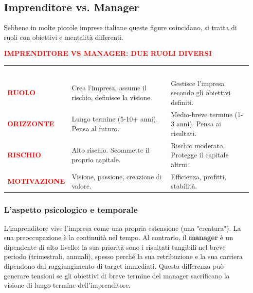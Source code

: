 \documentclass[a4paper,12pt]{article}
\begin{document}
	\subsection{Imprenditore vs. Manager}
	Sebbene in molte piccole imprese italiane queste figure coincidano, si tratta di ruoli con obiettivi e mentalità differenti.
	
	\begin{table}[h!]
		\centering
		\large
		\textbf{\textcolor{red}{IMPRENDITORE VS MANAGER: DUE RUOLI DIVERSI}}\\[0.5cm]
		\renewcommand{\arraystretch}{1.8}
		\begin{tabular}{l p{5.5cm} p{5.5cm}}
			\rowcolor{black}
			& \textbf{\textcolor{white}{IMPRENDITORE}} & \textbf{\textcolor{white}{MANAGER}} \\
			
			\textbf{\textcolor{red}{RUOLO}} & Crea l'impresa, assume il rischio, definisce la visione. & Gestisce l'impresa secondo gli obiettivi definiti. \\ \hline
			
			\textbf{\textcolor{red}{ORIZZONTE}} & Lungo termine (5-10+ anni). Pensa al futuro. & Medio-breve termine (1-3 anni). Pensa ai risultati. \\ \hline
			
			\textbf{\textcolor{red}{RISCHIO}} & Alto rischio. Scommette il proprio capitale. & Rischio moderato. Protegge il capitale altrui. \\ \hline
			
			\textbf{\textcolor{red}{MOTIVAZIONE}} & Visione, passione, creazione di valore. & Efficienza, profitti, stabilità. \\ \hline
		\end{tabular}
	\end{table}	
	
	\subsubsection{L'aspetto psicologico e temporale}
	L'imprenditore vive l'impresa come una propria estensione (una "creatura"). La sua preoccupazione è la continuità nel tempo. 
	Al contrario, il \textbf{manager} è un dipendente di alto livello: la sua priorità sono i risultati tangibili nel breve periodo (trimestrali, annuali), spesso perché la sua retribuzione e la sua carriera dipendono dal raggiungimento di target immediati. Questa differenza può generare tensioni se gli obiettivi di breve termine del manager sacrificano la visione di lungo termine dell'imprenditore.
	
\end{document}
